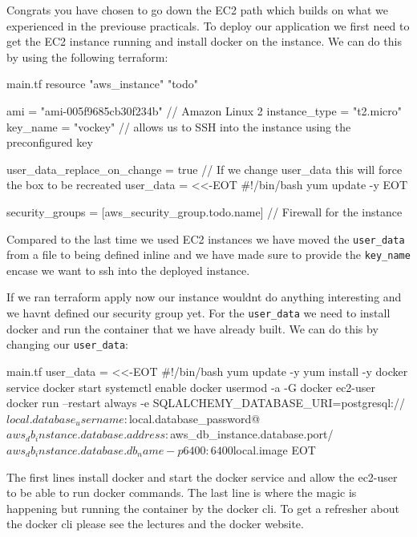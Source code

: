 \documentclass{csse4400}
\begin{document}
Congrats you have chosen to go down the EC2 path which builds on what we experienced in the previouse practicals. To deploy our application we first need to get the EC2 instance running and install docker on the instance. We can do this by using the following terraform:

\begin{code}[language=terraform,numbers=none]{main.tf}
  resource "aws_instance" "todo" {
    ami           = "ami-005f9685cb30f234b" // Amazon Linux 2
    instance_type = "t2.micro"
    key_name      = "vockey" // allows us to SSH into the instance using the preconfigured key
    
    user_data_replace_on_change = true // If we change user_data this will force the box to be recreated
    user_data                   = <<-EOT
  #!/bin/bash
  yum update -y
    EOT
  
    security_groups = [aws_security_group.todo.name] // Firewall for the instance
  }
\end{code}

Compared to the last time we used EC2 instances we have moved the \texttt{user\_data} from a file to being defined inline and we have made sure to provide the \texttt{key\_name} encase we want to ssh into the deployed instance.

If we ran terraform apply now our instance wouldnt do anything interesting and we havnt defined our security group yet. For the \texttt{user\_data} we need to install docker and run the container that we have already built. We can do this by changing our \texttt{user\_data}:

\begin{code}[language=terraform,numbers=none]{main.tf}
  user_data                   = <<-EOT
  #!/bin/bash
  yum update -y
  yum install -y docker
  service docker start
  systemctl enable docker
  usermod -a -G docker ec2-user 
  docker run --restart always -e SQLALCHEMY_DATABASE_URI=postgresql://${local.database_username}:${local.database_password}@${aws_db_instance.database.address}:${aws_db_instance.database.port}/${aws_db_instance.database.db_name} -p 6400:6400 ${local.image}
  EOT
\end{code}

The first lines install docker and start the docker service and allow the ec2-user to be able to run docker commands. The last line is where the magic is happening but running the container by the docker cli. To get a refresher about the docker cli please see the lectures and the docker website. 
\end{document}
